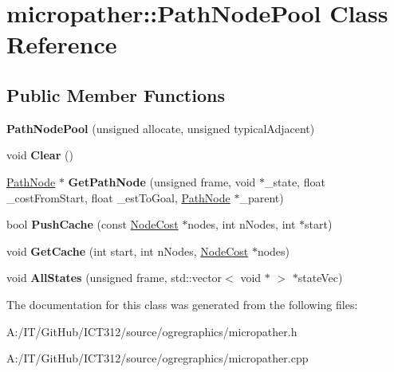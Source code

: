 \hypertarget{classmicropather_1_1_path_node_pool}{\section{micropather\-:\-:Path\-Node\-Pool Class Reference}
\label{classmicropather_1_1_path_node_pool}
}
\subsection*{Public Member Functions}
\begin{DoxyCompactItemize}
\item 
\hypertarget{classmicropather_1_1_path_node_pool_ab1aca79f43e44efce66672ab0f723171}{{\bfseries Path\-Node\-Pool} (unsigned allocate, unsigned typical\-Adjacent)}\label{classmicropather_1_1_path_node_pool_ab1aca79f43e44efce66672ab0f723171}

\item 
\hypertarget{classmicropather_1_1_path_node_pool_af6a649fb69b90a15ab61fcd52646dbe5}{void {\bfseries Clear} ()}\label{classmicropather_1_1_path_node_pool_af6a649fb69b90a15ab61fcd52646dbe5}

\item 
\hypertarget{classmicropather_1_1_path_node_pool_a2fb84945c87992d2bc8e691329b25202}{\hyperlink{classmicropather_1_1_path_node}{Path\-Node} $\ast$ {\bfseries Get\-Path\-Node} (unsigned frame, void $\ast$\-\_\-state, float \-\_\-cost\-From\-Start, float \-\_\-est\-To\-Goal, \hyperlink{classmicropather_1_1_path_node}{Path\-Node} $\ast$\-\_\-parent)}\label{classmicropather_1_1_path_node_pool_a2fb84945c87992d2bc8e691329b25202}

\item 
\hypertarget{classmicropather_1_1_path_node_pool_afa537a0ea924b67ee0970c89e73187ff}{bool {\bfseries Push\-Cache} (const \hyperlink{structmicropather_1_1_node_cost}{Node\-Cost} $\ast$nodes, int n\-Nodes, int $\ast$start)}\label{classmicropather_1_1_path_node_pool_afa537a0ea924b67ee0970c89e73187ff}

\item 
\hypertarget{classmicropather_1_1_path_node_pool_a5e3e48fc8848fb970e880fb1e2df52c6}{void {\bfseries Get\-Cache} (int start, int n\-Nodes, \hyperlink{structmicropather_1_1_node_cost}{Node\-Cost} $\ast$nodes)}\label{classmicropather_1_1_path_node_pool_a5e3e48fc8848fb970e880fb1e2df52c6}

\item 
\hypertarget{classmicropather_1_1_path_node_pool_aa921537c1c2e68e11fae4ef3d09fc152}{void {\bfseries All\-States} (unsigned frame, std\-::vector$<$ void $\ast$ $>$ $\ast$state\-Vec)}\label{classmicropather_1_1_path_node_pool_aa921537c1c2e68e11fae4ef3d09fc152}

\end{DoxyCompactItemize}


The documentation for this class was generated from the following files\-:\begin{DoxyCompactItemize}
\item 
A\-:/\-I\-T/\-Git\-Hub/\-I\-C\-T312/source/ogregraphics/micropather.\-h\item 
A\-:/\-I\-T/\-Git\-Hub/\-I\-C\-T312/source/ogregraphics/micropather.\-cpp\end{DoxyCompactItemize}
